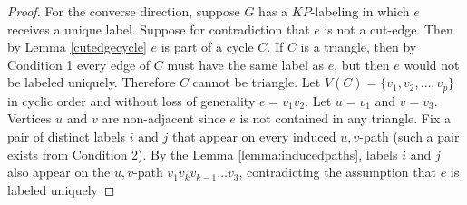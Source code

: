 \documentclass[12pt,a4paper,titlepage,openany]{report}
\begin{document}
\begin{proof}
For the converse direction, suppose $G$ has a $KP$-labeling in which $e$ receives a unique label. Suppose for contradiction that $e$ is not a cut-edge. Then by Lemma \ref{cutedgecycle} $e$ is part of a cycle $C$. If $C$ is a triangle, then by Condition 1 every edge of $C$ must have the same label as $e$, but then $e$ would not be labeled uniquely. Therefore $C$ cannot be triangle. 
Let $V(C) = \{v_1, v_2, \ldots, v_p\}$ in cyclic order and without loss of generality $e = v_1 v_2$. Let $u = v_1$ and $v = v_3$. Vertices $u$ and $v$ are non-adjacent since $e$ is not contained in any triangle. Fix a pair of distinct labels $i$ and $j$ that appear on every induced $u,v$-path (such a pair exists from Condition 2). By the Lemma \ref{lemma:inducedpaths}, labels $i$ and $j$ also appear on the $u,v$-path $v_1v_kv_{k-1}\ldots v_3$, contradicting the assumption that $e$ is labeled uniquely
\end{proof}
\end{document}
